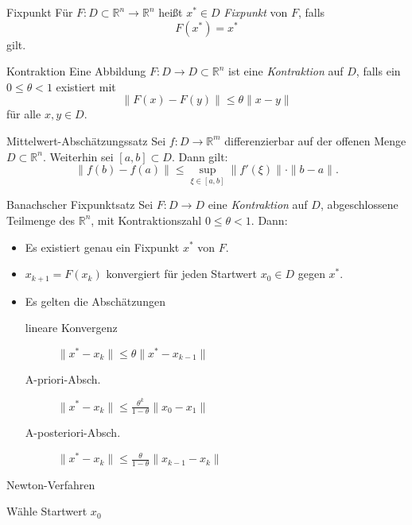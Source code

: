 
\begin{flashcard}[Definition]{Fixpunkt}
	Für $F : D \subset \mathbb{R}^n \rightarrow \mathbb{R}^n$ heißt $x^* \in D$ \emph{Fixpunkt} von $F$, falls
$$
	F(x^*) = x^*
$$
	gilt.
\end{flashcard}

\begin{flashcard}[Definition]{Kontraktion}
Eine Abbildung $F : D \rightarrow D \subset \mathbb{R}^n$ ist eine \emph{Kontraktion} auf $D$, falls ein $0 \leq \theta < 1$ existiert mit
$$
\| F(x) - F(y) \| \leq \theta \| x - y \|
$$
für alle $x, y \in D$.

\end{flashcard}

\begin{flashcard}[Satz]{Mittelwert-Abschätzungssatz}
	Sei $f : D \rightarrow \mathbb{R}^m$ differenzierbar auf der offenen Menge $D \subset \mathbb{R}^n$.
	Weiterhin sei $[a, b] \subset D$.
	Dann gilt:
	$$
		\|f(b) - f(a)\| \leq \sup_{\xi \in [a, b]} \|f'(\xi)\| \cdot \|b - a\|.
	$$
\end{flashcard}

\begin{flashcard}[Satz]{Banachscher Fixpunktsatz}
Sei $F : D \rightarrow D$ eine \emph{Kontraktion} auf $D$, abgeschlossene Teilmenge des $\mathbb{R}^n$, mit Kontraktionszahl $0 \leq \theta < 1$.
Dann:

\begin{itemize}
	\item Es existiert genau ein Fixpunkt $x^*$ von $F$.
	\item $x_{k+1} = F(x_k)$ konvergiert für jeden Startwert $x_0 \in D$ gegen $x^*$.
	\item Es gelten die Abschätzungen
		\begin{description}
			\item[lineare Konvergenz] $\| x^* - x_k\| \leq \theta \|x^* - x_{k-1}\|$
			\item[A-priori-Absch.] $\| x^* - x_k\| \leq \frac{\theta^k}{1-\theta} \|x_0 - x_1\|$
			\item[A-posteriori-Absch.] $\| x^* - x_k\| \leq \frac{\theta}{1-\theta} \|x_{k-1} - x_k\|$
		\end{description}
\end{itemize}
\end{flashcard}

\begin{flashcard}[Algorithmus]{Newton-Verfahren}
\begin{algorithm}[H]
	Wähle Startwert $x_0$\\
\end{algorithm}
\end{flashcard}


